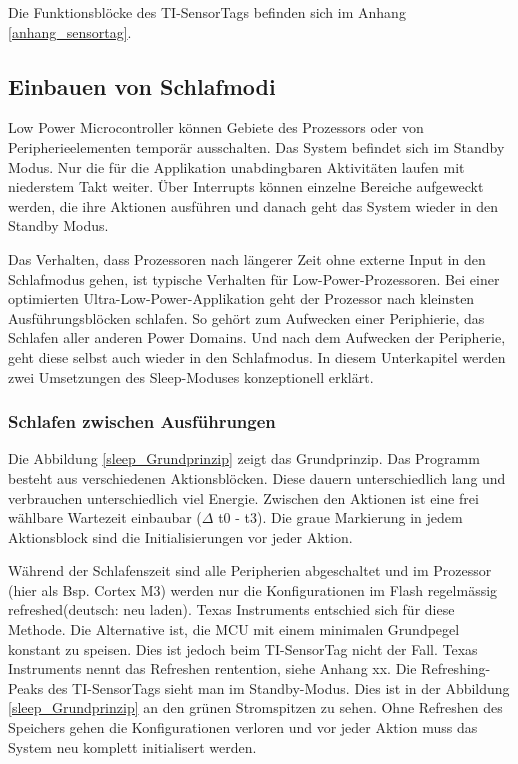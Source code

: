 Die Funktionsblöcke des TI-SensorTags befinden sich im Anhang \ref{anhang_sensortag}.

\subsection{Einbauen von Schlafmodi}\label{pm_sleep} 

Low Power Microcontroller können Gebiete des Prozessors oder von Peripherieelementen temporär ausschalten. Das System befindet sich im Standby Modus. Nur die für die Applikation unabdingbaren Aktivitäten laufen mit niederstem Takt weiter. Über Interrupts können einzelne Bereiche aufgeweckt werden, die ihre Aktionen ausführen und danach geht das System wieder in den Standby Modus.

Das Verhalten, dass Prozessoren nach längerer Zeit ohne externe Input in den Schlafmodus gehen, ist typische Verhalten für Low-Power-Prozessoren. Bei einer optimierten Ultra-Low-Power-Applikation geht der Prozessor nach kleinsten Ausführungsblöcken schlafen. So gehört zum Aufwecken einer Periphierie, das Schlafen aller anderen Power Domains. Und nach dem Aufwecken der Peripherie, geht diese selbst auch wieder in den Schlafmodus. In diesem Unterkapitel werden zwei Umsetzungen des Sleep-Moduses konzeptionell erklärt.

\subsubsection{Schlafen zwischen Ausführungen}
\label{schlafen_theorie}

Die Abbildung \ref{sleep_Grundprinzip} zeigt das Grundprinzip. Das Programm besteht aus verschiedenen Aktionsblöcken. Diese dauern unterschiedlich lang und verbrauchen unterschiedlich viel Energie. Zwischen den Aktionen ist eine frei wählbare Wartezeit einbaubar ($\Delta$ t0 - t3). Die graue Markierung in jedem Aktionsblock sind die Initialisierungen vor jeder Aktion.

Während der Schlafenszeit sind alle Peripherien abgeschaltet und im Prozessor (hier als Bsp. Cortex M3) werden nur die Konfigurationen im Flash regelmässig \glqq refreshed\grqq (deutsch: neu laden). Texas Instruments entschied sich für diese Methode. Die Alternative ist, die MCU mit einem minimalen Grundpegel konstant zu speisen. Dies ist jedoch beim TI-SensorTag nicht der Fall. Texas Instruments nennt das Refreshen \glqq rentention\grqq, siehe Anhang xx. Die Refreshing-Peaks des TI-SensorTags sieht man im Standby-Modus. Dies ist in der Abbildung \ref{sleep_Grundprinzip} an den grünen Stromspitzen zu sehen. Ohne Refreshen des Speichers gehen die Konfigurationen verloren und vor jeder Aktion muss das System neu komplett initialisert werden.

